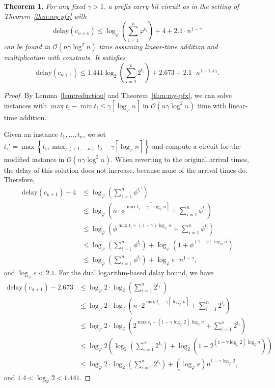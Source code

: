 \documentclass[11pt,final,microtype]{scrartcl}
\theoremstyle{plain}
\newtheorem{theorem}{Theorem}[section]
\theoremstyle{definition}
\theoremstyle{remark}
\newcommand{\ceil}[1]{\left\lceil #1 \right\rceil}
\newcommand{\ld}{\log_{2}}
\newcommand{\loq}{\log_{\varphi}}
\newcommand{\delay}{\mathrm{delay}}
\newcommand{\sset}[1]{\left\{#1\right\}}
\begin{document}
\begin{theorem} \label{thm:fast-pfx} For any fixed $\gamma > 1$, a
  prefix carry bit circuit as in the setting of
  Theorem~\ref{thm:my-pfx} with $$\delay(c_{n+1}) \leq \loq
  \left(\sum_{i=1}^{n} \varphi^{t_i}\right) + 4 + 2.1 \cdot
  n^{1-\gamma }$$ can be found in $\mathcal{O}(n\gamma\log^2 n)$ time
  assuming linear-time addition and multiplication with constants.  It
  satisfies
  $$\delay(c_{n+1}) \leq 1.441 \ld
  \left(\sum_{i=1}^n 2^{t_i}\right) + 2.673 + 2.1 \cdot
  n^{1-1.4\gamma}.$$
\end{theorem}
\begin{proof}
  By Lemma~\ref{lem:reduction} and Theorem~\ref{thm:my-pfx}, we can
  solve instances with $\max t_i - \min t_i \leq \gamma \ceil{\loq n}$
  in $\mathcal{O}(n \gamma\log^2 n)$ time with linear-time addition.

  Given an instance $t_1, \dots, t_n$, we set $t_i' = \max\sset{t_i,
    \max_{j \in \sset{1, \dots, n}}
    t_j - \gamma\ceil{\loq n}}$ and compute a circuit for the modified
  instance in $\mathcal{O}(n \gamma\log^2 n)$. When reverting to the original
  arrival times, the delay of this solution does not increase, because
  none of the arrival times do. Therefore, 
  \begin{align*}
    \delay(c_{n+1}) - 4&\leq \loq \left(\sum_{i=1}^{n} \phi^{t_i'}\right) 
\\    &\leq \loq \left(n \cdot \phi^{\max t_i - \gamma\ceil{\loq n}}
      + \sum_{i=1}^{n} \phi^{t_i}\right) \\
    &\leq \loq \left(\phi^{\max t_i + (1-\gamma) \loq n}
      + \sum_{i=1}^{n} \phi^{t_i}\right) \\
    &\leq \loq \left(\sum_{i=1}^{n} \phi^{t_i}\right) + \loq \left(1 +
    \phi^{(1-\gamma) \loq n}\right) \\
    &\leq \loq \left(\sum_{i=1}^{n} \phi^{t_i}\right) + 
    \loq e \cdot n^{1-\gamma }, 
  \end{align*}
  and $\loq e < 2.1$. For the dual logarithm-based delay bound, we
  have
  \begin{align*}
    \delay(c_{n+1}) - 2.673 &\leq \loq 2 \cdot\ld \left(\sum_{i=1}^{n} 2^{t_i'}\right)
    \\ &\leq \loq 2 \cdot\ld \left(n \cdot 2^{\max t_i - \gamma\ceil{\loq
          n}}
      + \sum_{i=1}^{n} 2^{t_i}\right) \\
    &\leq\loq 2 \cdot \ld \left(2^{\max t_i - (1-\gamma\loq 2) \ld n}
      + \sum_{i=1}^{n} 2^{t_i}\right) \\
    &\leq \loq 2  \left(\ld \left(\sum_{i=1}^{n} 2^{t_i}\right) + \ld
    \left(1 +
      2^{(1-\gamma\loq 2) \ld n}\right)\right) \\
    &\leq \loq 2 \cdot \ld \left(\sum_{i=1}^{n} 2^{t_i}\right) + (\loq e)
    n^{1-\gamma\loq 2},
  \end{align*}
  and $1.4 < \loq 2 < 1.441$. 
\end{proof}
\end{document}
